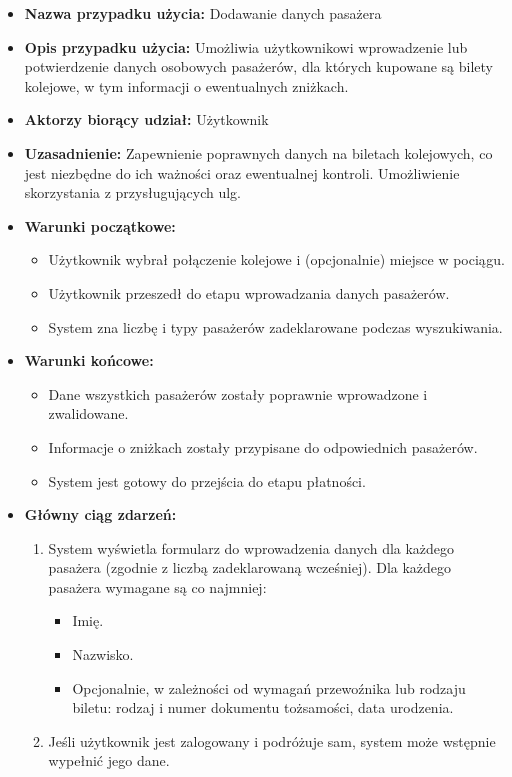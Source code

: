 \documentclass[a4paper,12pt]{article}
\begin{document}
\begin{itemize}
\item \textbf{Nazwa przypadku użycia:} Dodawanie danych pasażera
\item \textbf{Opis przypadku użycia:} Umożliwia użytkownikowi wprowadzenie lub potwierdzenie danych osobowych pasażerów, dla których kupowane są bilety kolejowe, w tym informacji o ewentualnych zniżkach.
\item \textbf{Aktorzy biorący udział:} Użytkownik
\item \textbf{Uzasadnienie:} Zapewnienie poprawnych danych na biletach kolejowych, co jest niezbędne do ich ważności oraz ewentualnej kontroli. Umożliwienie skorzystania z przysługujących ulg.
\item \textbf{Warunki początkowe:}
\begin{itemize}
\item Użytkownik wybrał połączenie kolejowe i (opcjonalnie) miejsce w pociągu.
\item Użytkownik przeszedł do etapu wprowadzania danych pasażerów.
\item System zna liczbę i typy pasażerów zadeklarowane podczas wyszukiwania.
\end{itemize}
\item \textbf{Warunki końcowe:}
\begin{itemize}
\item Dane wszystkich pasażerów zostały poprawnie wprowadzone i zwalidowane.
\item Informacje o zniżkach zostały przypisane do odpowiednich pasażerów.
\item System jest gotowy do przejścia do etapu płatności.
\end{itemize}
\item \textbf{Główny ciąg zdarzeń:}
\begin{enumerate}
\item System wyświetla formularz do wprowadzenia danych dla każdego pasażera (zgodnie z liczbą zadeklarowaną wcześniej). Dla każdego pasażera wymagane są co najmniej:
\begin{itemize}
\item Imię.
\item Nazwisko.
\item Opcjonalnie, w zależności od wymagań przewoźnika lub rodzaju biletu: rodzaj i numer dokumentu tożsamości, data urodzenia.
\end{itemize}
\item Jeśli użytkownik jest zalogowany i podróżuje sam, system może wstępnie wypełnić jego dane.

\end{enumerate}
\end{itemize}
\end{document}
